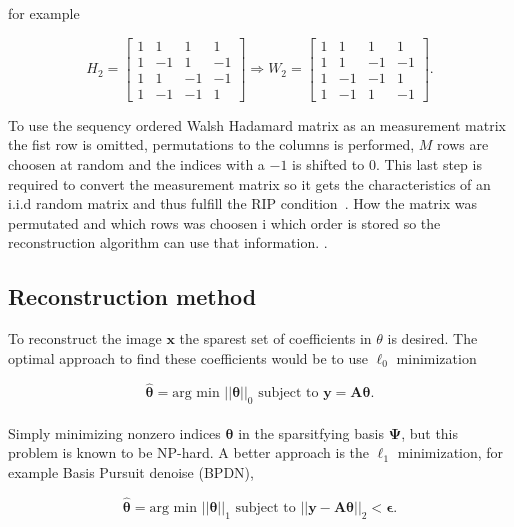 for example

\begin{equation}
    H_2 =  \begin{bmatrix}
       1 & 1 & 1 & 1 \\
       1 & -1 & 1 & -1 \\
       1 & 1 & -1 & -1 \\
       1 & -1 & -1 & 1 
       \end{bmatrix} \Rightarrow W_2 = \begin{bmatrix}
       1 & 1 & 1 & 1 \\
       1 & 1 & -1 & -1  \\
       1 & -1 & -1 & 1  \\
       1 & -1 & 1 & -1 
       \end{bmatrix}.
\end{equation}

To use the sequency ordered Walsh Hadamard matrix as an measurement matrix the fist row is omitted, permutations to the columns is performed, $M$ rows are choosen at random and the indices with a $-1$ is shifted to $0$. This last step is required to convert the measurement matrix so it gets the characteristics of an i.i.d random matrix and thus fulfill the RIP condition~\cite{article:SRM_long}. How the matrix was permutated and which rows was choosen i which order is stored so the reconstruction algorithm can use that information. \cite{article:SRM_long, article:TVAL3, article:an_improved_WH_matrix}. 

\subsection{Reconstruction method}
To reconstruct the image $\textbf{x}$ the sparest set of coefficients in $\theta$ is desired. The optimal approach to find these coefficients would be to use $\ell_0$ minimization


\begin{equation}
   \mathbf{ \hat{\theta}} = \text{arg min } ||\mathbf{\theta}||_0 \text{  subject to  } \mathbf{y = A\theta} \text{.}
\end{equation}\\[0.1in]


Simply minimizing nonzero indices $\mathbf{\theta}$ in the sparsitfying basis $\mathbf{\Psi}$, but this problem is known to be NP-hard. A better approach is the $\ell_1$ minimization, for example Basis Pursuit denoise (BPDN),

\begin{equation}
    \mathbf{\hat{\theta}} = \text{arg min } ||\mathbf{\theta}||_1 \text{  subject to  } ||\mathbf{y - A\theta}||_2 < \mathbf{\epsilon} \text{.}
\end{equation}\\[0.1in]


